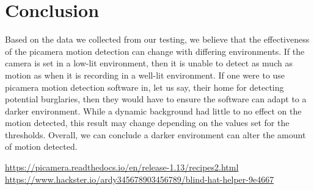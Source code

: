 \documentclass[sigsmall]{acmart}
\begin{document}
\section*{Conclusion}
Based on the data we collected from our testing, we believe that the effectiveness of the picamera motion detection can change with differing environments. If the camera is set in a low-lit environment, then it is unable to detect as much as motion as when it is recording in a well-lit environment. If one were to use picamera motion detection software in, let us say, their home for detecting potential burglaries, then they would have to ensure the software can adapt to a darker environment. While a dynamic background had little to no effect on the motion detected, this result may change depending on the values set for the thresholds. Overall, we can conclude a darker environment can alter the amount of motion detected. 

\begin{thebibliography}{100}	
	 \url{https://picamera.readthedocs.io/en/release-1.13/recipes2.html}
	 \url{https://www.hackster.io/ardy345678903456789/blind-hat-helper-9e4667}
\end{thebibliography}
\end{document}
